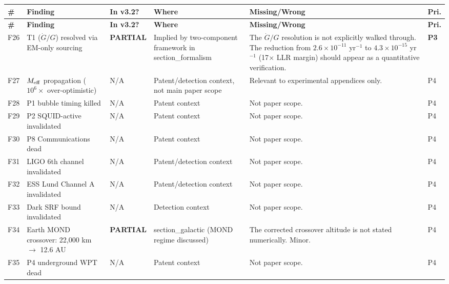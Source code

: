 \documentclass[11pt,a4paper]{article}
\newcommand{\PARTIAL}{\textcolor{partial}{\textbf{PARTIAL}}}
\begin{document}
\begin{longtable}{|p{0.5cm}|p{3.5cm}|p{1.2cm}|p{3.5cm}|p{4.5cm}|p{1cm}|}
\hline
\textbf{\#} & \textbf{Finding} & \textbf{In v3.2?} & \textbf{Where} & \textbf{Missing/Wrong} & \textbf{Pri.} \\
\hline
\endfirsthead
\hline
\textbf{\#} & \textbf{Finding} & \textbf{In v3.2?} & \textbf{Where} & \textbf{Missing/Wrong} & \textbf{Pri.} \\
\hline
\endhead

F26 & T1 ($\dot{G}/G$) resolved via EM-only sourcing &
\PARTIAL &
Implied by two-component framework in section\_formalism &
The $\dot{G}/G$ resolution is not explicitly walked through. The reduction from $2.6 \times 10^{-11}$ yr$^{-1}$ to $4.3 \times 10^{-15}$ yr$^{-1}$ (17$\times$ LLR margin) should appear as a quantitative verification. &
\textbf{P3} \\
\hline

F27 & $M_{\rm eff}$ propagation ($10^6\times$ over-optimistic) &
N/A &
Patent/detection context, not main paper scope &
Relevant to experimental appendices only. &
P4 \\
\hline

F28 & P1 bubble timing killed &
N/A & Patent context & Not paper scope. & P4 \\
\hline

F29 & P2 SQUID-active invalidated &
N/A & Patent context & Not paper scope. & P4 \\
\hline

F30 & P8 Communications dead &
N/A & Patent context & Not paper scope. & P4 \\
\hline

F31 & LIGO 6th channel invalidated &
N/A & Patent/detection context & Not paper scope. & P4 \\
\hline

F32 & ESS Lund Channel A invalidated &
N/A & Patent/detection context & Not paper scope. & P4 \\
\hline

F33 & Dark SRF bound invalidated &
N/A & Detection context & Not paper scope. & P4 \\
\hline

F34 & Earth MOND crossover: 22,000 km $\to$ 12.6 AU &
\PARTIAL &
section\_galactic (MOND regime discussed) &
The corrected crossover altitude is not stated numerically. Minor. &
P4 \\
\hline

F35 & P4 underground WPT dead &
N/A & Patent context & Not paper scope. & P4 \\
\hline


\end{longtable}
\end{document}
